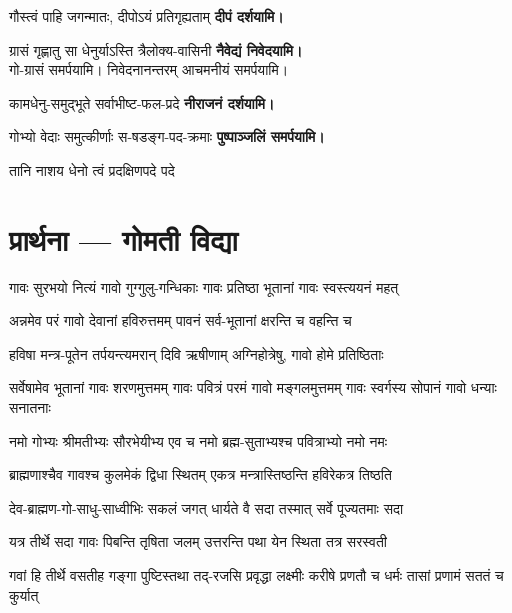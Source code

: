 \begin{center}
{गौस्त्वं पाहि जगन्मातः, दीपोऽयं प्रतिगृह्यताम्}
\textbf{\devAya{} दीपं दर्शयामि।}

{ग्रासं गृह्णातु सा धेनुर्याऽस्ति त्रैलोक्य-वासिनी}
\textbf{\devAya{} नैवेद्यं निवेदयामि।}\\
गो-ग्रासं समर्पयामि। निवेदनानन्तरम् आचमनीयं समर्पयामि।

{कामधेनु-समुद्भूते सर्वाभीष्ट-फल-प्रदे}
\textbf{\devAya{} नीराजनं दर्शयामि।}

{गोभ्यो वेदाः समुत्कीर्णाः स-षडङ्ग-पद-क्रमाः}
\textbf{\devAya{} पुष्पाञ्जलिं समर्पयामि।}

{तानि नाशय धेनो त्वं प्रदक्षिणपदे पदे}


\section{प्रार्थना — गोमती विद्या}

\addtocounter{shlokacount}{49}

\twolineshloka
{गावः सुरभयो नित्यं गावो गुग्गुलु-गन्धिकाः}
{गावः प्रतिष्ठा भूतानां गावः स्वस्त्ययनं महत्}

\twolineshloka
{अन्नमेव परं गावो देवानां हविरुत्तमम्}
{पावनं सर्व-भूतानां क्षरन्ति च वहन्ति च}%

\twolineshloka
{हविषा मन्त्र-पूतेन तर्पयन्त्यमरान् दिवि}
{ऋषीणाम् अग्निहोत्रेषु, गावो होमे प्रतिष्ठिताः}%

\threelineshloka
{सर्वेषामेव भूतानां गावः शरणमुत्तमम्}
{गावः पवित्रं परमं गावो मङ्गलमुत्तमम्}
{गावः स्वर्गस्य सोपानं गावो धन्याः सनातनाः}

\twolineshloka
{नमो गोभ्यः श्रीमतीभ्यः सौरभेयीभ्य एव च}
{नमो ब्रह्म-सुताभ्यश्च पवित्राभ्यो नमो नमः}%

\twolineshloka
{ब्राह्मणाश्चैव गावश्च कुलमेकं द्विधा स्थितम्}
{एकत्र मन्त्रास्तिष्ठन्ति हविरेकत्र तिष्ठति}%

\twolineshloka
{देव-ब्राह्मण-गो-साधु-साध्वीभिः सकलं जगत्}
{धार्यते वै सदा तस्मात् सर्वे पूज्यतमाः सदा}%

\twolineshloka
{यत्र तीर्थे सदा गावः पिबन्ति तृषिता जलम्}
{उत्तरन्ति पथा येन स्थिता तत्र सरस्वती}%

\fourlineindentedshloka
{गवां हि तीर्थे वसतीह गङ्गा}
{पुष्टिस्तथा तद्-रजसि प्रवृद्धा}
{लक्ष्मीः करीषे प्रणतौ च धर्मः}
{तासां प्रणामं सततं च कुर्यात्}%


\end{center}
